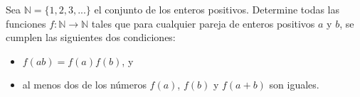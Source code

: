 Sea $\mathbb N = \{1, 2, 3, . . .\}$ el conjunto de los enteros positivos. Determine todas las funciones $f : \mathbb N \to \mathbb N$ tales que para cualquier pareja de enteros positivos $a$ y $b$, se cumplen las siguientes dos condiciones:
 \begin{itemize} 
 \item  $f(ab) = f(a)f(b)$, y
 \item  al menos dos de los números $f(a)$, $f(b)$ y $f(a + b)$ son iguales.
 \end{itemize} 